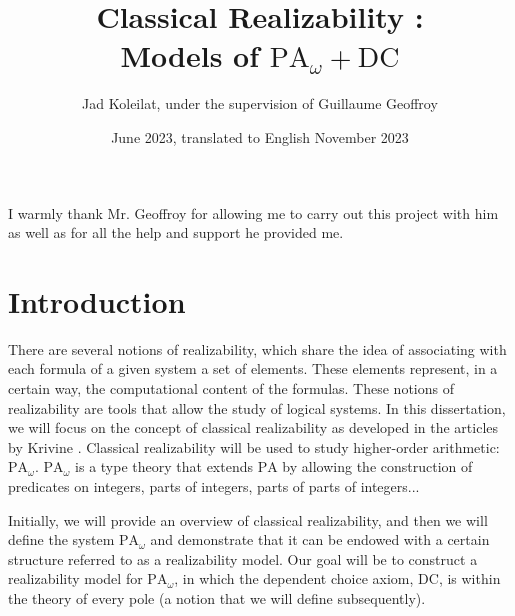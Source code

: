 \documentclass[a4paper,12pt]{article}
\theoremstyle{rmqstyle}
\newcommand{\PA}{\mathrm{PA}}
\newcommand{\DC}{\mathrm{DC}}
\begin{document}
\begin{titlepage}
\title{Classical Realizability :\\
Models of $\PA_\omega + \DC$} 
\author{Jad Koleilat, under the supervision of Guillaume Geoffroy}
\date{June 2023, translated to English November 2023}
\maketitle
{}
\thispagestyle{empty}
\end{titlepage}

\vspace*{\fill}
I warmly thank Mr. Geoffroy for allowing me to carry out this project with him as well as for all the help and support he provided me.
\vspace*{\fill}
\thispagestyle{empty}
\clearpage

\tableofcontents
\thispagestyle{empty}

\clearpage


\setcounter{secnumdepth}{0}

\section{Introduction}
\label{introduction}

There are several notions of realizability, which share the idea of associating with each formula of a given system a set of elements. These elements represent, in a certain way, the computational content of the formulas. These notions of realizability are tools that allow the study of logical systems. In this dissertation, we will focus on the concept of classical realizability as developed in the articles by Krivine \cite{KrivineRC} \cite{KrivineRA2}. Classical realizability will be used to study higher-order arithmetic: $\PA_\omega$. $\PA_\omega$ is a type theory that extends $\PA$ by allowing the construction of predicates on integers, parts of integers, parts of parts of integers...

Initially, we will provide an overview of classical realizability, and then we will define the system $\PA_\omega$ and demonstrate that it can be endowed with a certain structure referred to as a realizability model. Our goal will be to construct a realizability model for $\PA_\omega$, in which the dependent choice axiom, $\DC$, is within the theory of every pole (a notion that we will define subsequently).
\end{document}
